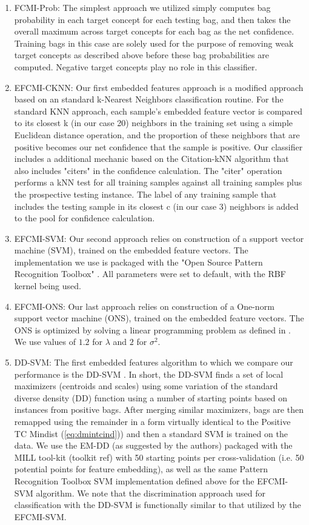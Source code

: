 \documentclass[12pt,dvips]{report}
\numberwithin{equation}{section}
\begin{document}
\begin{enumerate}

	\item FCMI-Prob: The simplest approach we utilized simply computes bag probability in each target concept for each testing bag, and then takes the overall maximum across target concepts for each bag as the net confidence.  Training bags in this case are solely used for the purpose of removing weak target concepts as described above before these bag probabilities are computed.  Negative target concepts play no role in this classifier.
	\item EFCMI-CKNN: Our first embedded features approach is a modified approach based on an standard k-Nearest Neighbors \cite{coverhart1967} classification routine.  For the standard KNN approach, each sample's embedded feature vector is compared to its closest k (in our case 20) neighbors in the training set using a simple Euclidean distance operation, and the proportion of these neighbors that are positive becomes our net confidence that the sample is positive.  Our classifier includes a additional mechanic based on the Citation-kNN \cite{Wang00lazylearning} algorithm that also includes "citers" in the confidence calculation.  The "citer" operation performs a kNN test for all training samples against all training samples plus the prospective testing instance.  The label of any training sample that includes the testing sample in its closest c (in our case 3) neighbors is added to the pool for confidence calculation.
	\item EFCMI-SVM: Our second approach relies on construction of a support vector machine (SVM), trained on the embedded feature vectors.  The implementation we use is packaged with the "Open Source Pattern Recognition Toolbox" \cite{morton2014open}.  All parameters were set to default, with the RBF kernel being used.
	\item EFCMI-ONS: Our last approach relies on construction of a One-norm support vector machine (ONS), trained on the embedded feature vectors.  The ONS is optimized by solving a linear programming problem as defined in \cite{chen06_miles}.  We use values of $1.2$ for $\lambda$ and $2$ for $\sigma^{2}$.
	\item DD-SVM: The first embedded features algorithm to which we compare our performance is the DD-SVM \cite{chen04_ddsvm}.  In short, the DD-SVM finds a set of local maximizers (centroids and scales) using some variation of the standard diverse density (DD) function using a number of starting points based on instances from positive bags.  After merging similar maximizers, bags are then remapped using the remainder in a form virtually identical to the Positive TC Mindist (\ref{eq:dmintcind})) and then a standard SVM is trained on the data.  We use the EM-DD (as suggested by the authors) packaged with the MILL tool-kit (toolkit ref) with 50 starting points per cross-validation (i.e. 50 potential points for feature embedding), as well as the same Pattern Recognition Toolbox SVM implementation defined above for the EFCMI-SVM algorithm.  We note that the discrimination approach used for classification with the DD-SVM is functionally similar to that utilized by the EFCMI-SVM.

\end{enumerate}
\end{document}
